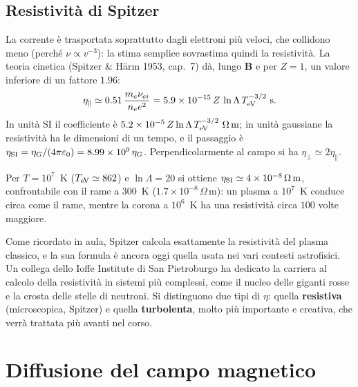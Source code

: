 \subsection{Resistività di Spitzer}
La corrente è trasportata soprattutto dagli elettroni più veloci, che collidono meno (perché $\nu\propto v^{-3}$): la stima semplice sovrastima quindi la resistività.
La teoria cinetica (Spitzer \& H\"arm 1953, cap.~7) dà, lungo $\mathbf{B}$ e per $Z=1$, un valore inferiore di un fattore $1.96$:
\begin{equation}
\eta_\parallel\simeq0.51\,\frac{m_e\nu_{ei}}{n_ee^2}=5.9\times10^{-15}\,Z\,\ln\Lambda\,T_{\rm eV}^{-3/2}\ \mathrm{s} .
\end{equation}
In unità SI il coefficiente è $5.2\times10^{-5}\,Z\ln\Lambda\,T_{\rm eV}^{-3/2}\ \Omega\,\mathrm{m}$; in unità gaussiane la resistività ha le dimensioni di un tempo, e il passaggio è $\eta_{\rm SI}=\eta_G/(4\pi\varepsilon_0)=8.99\times10^{9}\,\eta_G$.
Perpendicolarmente al campo si ha $\eta_\perp\simeq2\eta_\parallel$.

Per $T=10^7$~K ($T_{\rm eV}\simeq862$) e $\ln\Lambda=20$ si ottiene $\eta_{\rm SI}\simeq4\times10^{-8}\,\Omega\,\mathrm{m}$, confrontabile con il rame a 300~K ($1.7\times10^{-8}\,\Omega\,\mathrm{m}$): un plasma a $10^7$~K conduce circa come il rame, mentre la corona a $10^6$~K ha una resistività circa $100$ volte maggiore.

Come ricordato in aula, Spitzer calcola esattamente la resistività del plasma classico, e la sua formula è ancora oggi quella usata nei vari contesti astrofisici. Un collega dello Ioffe Institute di San Pietroburgo ha dedicato la carriera al calcolo della resistività in sistemi più complessi, come il nucleo delle giganti rosse e la crosta delle stelle di neutroni.
Si distinguono due tipi di $\eta$: quella \textbf{resistiva} (microscopica, Spitzer) e quella \textbf{turbolenta}, molto più importante e creativa, che verrà trattata più avanti nel corso.

\section{Diffusione del campo magnetico}

